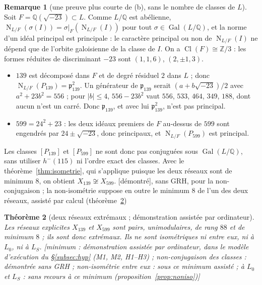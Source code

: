 \documentclass[11pt,a4paper]{amsart}
\theoremstyle{plain}
\newtheorem{theoreme}{Théorème}[section]
\theoremstyle{definition}
\newtheorem{remarque}[theoreme]{Remarque}
\numberwithin{equation}{section}
\newcommand{\Q}{\mathbb{Q}}
\newcommand{\Z}{\mathbb{Z}}
\DeclareMathOperator{\Nm}{N}
\DeclareMathOperator{\Cl}{Cl}
\DeclareMathOperator{\Gal}{Gal}
\newcommand{\Lz}{L_{0}}
\newcommand{\LS}{L_{S}}
\newcommand{\st}[1]{\textup{\textsf{\small[#1]}}}
\newcommand{\DEM}{\st{démontré}}
\begin{document}
\begin{remarque}[une preuve plus courte de (b), sans le nombre de classes de $L$]\label{rem:normeF}
Soit $F=\Q(\sqrt{-23})\subset L$. Comme $L/\Q$ est abélienne, $\Nm_{L/F}(\sigma(I))=\sigma|_F(\Nm_{L/F}(I))$ pour tout $\sigma\in\Gal(L/\Q)$, et la norme d'un idéal principal est principale : le caractère principal ou non de $\Nm_{L/F}(I)$ ne dépend que de l'orbite galoisienne de la classe de $I$. On a $\Cl(F)\cong\Z/3$ : les formes réduites de discriminant $-23$ sont $(1,1,6)$, $(2,\pm1,3)$.
\begin{itemize}
\item $139$ est décomposé dans $F$ et de degré résiduel $2$ dans $L$ ; donc $\Nm_{L/F}(P_{139})=\mathfrak p_{139}^2$. Un générateur de $\mathfrak p_{139}$ serait $(a+b\sqrt{-23})/2$ avec $a^2+23b^2=556$ ; pour $|b|\le4$, $556-23b^2$ vaut $556$, $533$, $464$, $349$, $188$, dont aucun n'est un carré. Donc $\mathfrak p_{139}$, et avec lui $\mathfrak p_{139}^2$, n'est pas principal.
\item $599=24^2+23$ : les deux idéaux premiers de $F$ au-dessus de $599$ sont engendrés par $24\pm\sqrt{-23}$, donc principaux, et $\Nm_{L/F}(P_{599})$ est principal.
\end{itemize}
Les classes $[P_{139}]$ et $[P_{599}]$ ne sont donc pas conjuguées sous $\Gal(L/\Q)$, sans utiliser $h^-(115)$ ni l'ordre exact des classes. Avec le théorème~\ref{thm:isometrie}, qui s'applique puisque les deux réseaux sont de minimum $8$, on obtient $X_{139}\not\cong X_{599}$. \DEM, sans GRH, pour la non-conjugaison ; la non-isométrie suppose en outre le minimum $8$ de l'un des deux réseaux, assisté par calcul (théorème~\ref{thm:extremaux})
\end{remarque}


\begin{theoreme}[deux réseaux extrémaux ; démonstration assistée par ordinateur]\label{thm:extremaux}
Les réseaux explicites $X_{139}$ et $X_{599}$ sont pairs, unimodulaires, de rang $88$ et de minimum $8$ ; ils sont donc extrémaux. Ils ne sont isométriques ni entre eux, ni à $\Lz$, ni à $\LS$.
\st{minimum : démonstration assistée par ordinateur, dans le modèle d'exécution du \S\ref{subsec:hyp} (M1, M2, H1--H3) ; non-conjugaison des classes : démontrée sans GRH ; non-isométrie entre eux : sous ce minimum assisté ; à $\Lz$ et $\LS$ : sans recours à ce minimum (proposition~\ref{prop:noniso})}
\end{theoreme}
\end{document}
